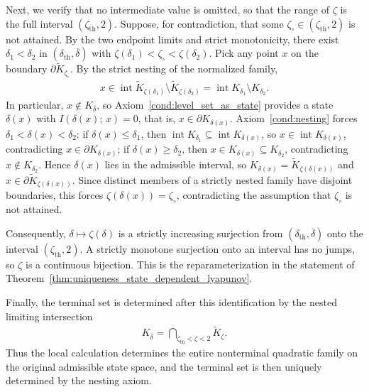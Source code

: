 \documentclass{article}
\begin{document}
Next, we verify that no intermediate value is omitted, so that the range of
$\zeta$ is the full interval $(\zeta_{\mathrm{th}},2)$. Suppose, for
contradiction, that some $\zeta_\circ\in(\zeta_{\mathrm{th}},2)$ is
not attained. By the two endpoint limits and strict monotonicity, there
exist $\delta_1<\delta_2$ in
$(\delta_{\mathrm{th}},\overline\delta)$ with
$\zeta(\delta_1)<\zeta_\circ<\zeta(\delta_2)$. Pick any point $x$ on the
boundary $\partial\widetilde K_{\zeta_\circ}$. By the strict nesting of the
normalized family,
\begin{align}
x
\in
\operatorname{int}\widetilde K_{\zeta(\delta_1)}
\setminus
\widetilde K_{\zeta(\delta_2)}
=
\operatorname{int}K_{\delta_1}\setminus K_{\delta_2}.
\end{align}
In particular, $x\notin K_{\overline\delta}$, so
Axiom~\ref{cond:level_set_as_state} provides a state $\delta(x)$ with
$I(\delta(x);\,x)=0$, that is, $x\in\partial K_{\delta(x)}$.
Axiom~\ref{cond:nesting} forces $\delta_1<\delta(x)<\delta_2$: if
$\delta(x)\le\delta_1$, then
$\operatorname{int}K_{\delta_1}\subseteq\operatorname{int}K_{\delta(x)}$,
so $x\in\operatorname{int}K_{\delta(x)}$, contradicting
$x\in\partial K_{\delta(x)}$; if $\delta(x)\ge\delta_2$, then
$x\in K_{\delta(x)}\subseteq K_{\delta_2}$, contradicting $x \notin K_{\delta_2}$. Hence $\delta(x)$ lies in the admissible interval, so
$K_{\delta(x)}=\widetilde K_{\zeta(\delta(x))}$ and
$x\in\partial\widetilde K_{\zeta(\delta(x))}$. Since distinct members of a
strictly nested family have disjoint boundaries, this forces
$\zeta(\delta(x))=\zeta_\circ$, contradicting the assumption that
$\zeta_\circ$ is not attained.

Consequently, $\delta\mapsto\zeta(\delta)$ is a strictly increasing
surjection from $(\delta_{\mathrm{th}},\overline\delta)$ onto the
interval $(\zeta_{\mathrm{th}},2)$. A strictly monotone surjection
onto an interval has no jumps, so $\zeta$ is a continuous bijection. This
is the reparameterization in the statement of
Theorem~\ref{thm:uniqueness_state_dependent_lyapunov}.

Finally, the terminal set is determined after this identification by the
nested limiting intersection
\begin{align}
K_{\bar\delta}
=
\bigcap_{\zeta_{\mathrm{th}}<\zeta<2}
\widetilde K_\zeta .
\end{align}
Thus the local calculation determines the entire nonterminal quadratic family
on the original admissible state space, and the terminal set is then uniquely
determined by the nesting axiom.
\end{document}
